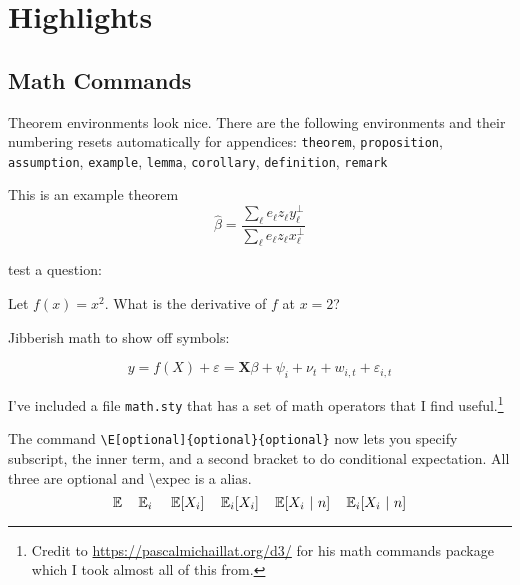 \documentclass[12pt]{article}
\begin{document}
\section{Highlights}

\subsection{Math Commands}

Theorem environments look nice. There are the following environments and their numbering resets automatically for appendices: \texttt{theorem}, \texttt{proposition}, \texttt{assumption}, \texttt{example}, \texttt{lemma}, \texttt{corollary}, \texttt{definition}, \texttt{remark}

\begin{theorem}\label{thm:residue_thm}
  This is an example theorem \[
    \hat{\beta}=\frac{\sum_{\ell}e_{\ell}z_{\ell}y_{\ell}^{\perp}}{\sum_{\ell}e_{\ell}z_{\ell}x_{\ell}^{\perp}}
  \]
\end{theorem}

test a question:

\begin{question}
Let \( f(x) = x^2 \). What is the derivative of \( f \) at \( x = 2 \)?
\end{question}

Jibberish math to show off symbols:

\begin{equation}\label{eq:fe_reg}
  y = f(X) + \varepsilon = \symbf{X} \beta + \psi_i + \nu_t + w_{i,t} + \varepsilon_{i,t}
\end{equation}

I've included a file \texttt{math.sty} that has a set of math operators that I find useful.\footnote{Credit to \url{https://pascalmichaillat.org/d3/} for his math commands package which I took almost all of this from.} 

The command \texttt{\textbackslash E[optional]\{optional\}\{optional\}} now lets you specify subscript, the inner term, and a second bracket to do conditional expectation. All three are optional and \textbackslash expec is a alias.
$$\E \quad \E[i] \quad \E{X_i} \quad \E[i]{X_i} \quad \E{X_i}{n} \quad \E[i]{X_i}{n}$$
\end{document}

